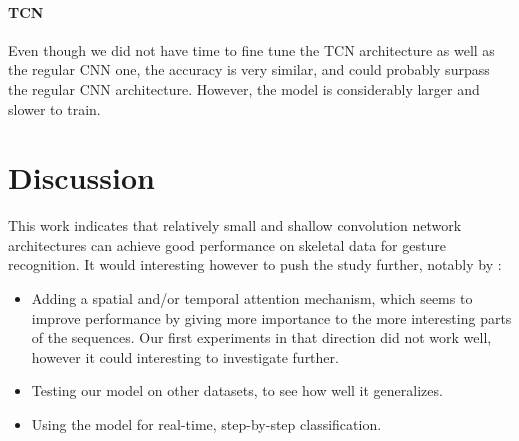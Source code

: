\documentclass{article}
\begin{document}
\paragraph{TCN}
Even though we did not have time to fine tune the TCN architecture as well as the regular CNN one, the accuracy is very similar, and could probably surpass the regular CNN architecture. However, the model is considerably larger and slower to train.


\section{Discussion}
This work indicates that relatively small and shallow convolution network architectures can achieve good performance on skeletal data for gesture recognition.
It would interesting however to push the study further, notably by :
\begin{itemize}
    \item Adding a spatial and/or temporal attention mechanism, which seems to improve performance \cite{STA-Res-TCN} by giving more importance to the more interesting parts of the sequences. Our first experiments in that direction did not work well, however it could interesting to investigate further.
    \item Testing our model on other datasets, to see how well it generalizes.
    \item Using the model for real-time, step-by-step classification.
\end{itemize}






\end{document}
